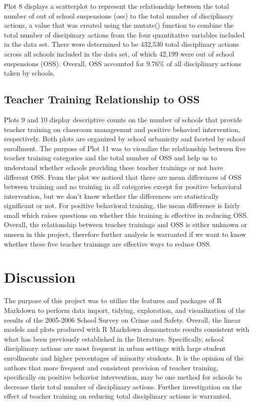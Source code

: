 \documentclass[
  man, fleqn, noextraspace]{apa6}
\begin{document}
Plot 8 displays a scatterplot to represent the relationship between the total number of out of school suspensions (oss) to the total number of disciplinary actions, a value that was created using the mutate() function to combine the total number of discipinary actions from the four quantitative variables included in the data set. There were determined to be 432,530 total disciplinary actions across all schools included in the data set, of which 42,199 were out of school suspensions (OSS). Overall, OSS accounted for 9.76\% of all disciplinary actions taken by schools.

\hypertarget{teacher-training-relationship-to-oss-1}{%
\subsection{Teacher Training Relationship to OSS}\label{teacher-training-relationship-to-oss-1}}

Plots 9 and 10 display descriptive counts on the number of schools that provide teacher training on classroom manageemnt and positive behaviorl intervention, respectively. Both plots are organized by school urbanicity and faceted by school enrollment. The purpose of Plot 11 was to visualize the relationship between five teacher training categories and the total number of OSS and help us to understand whether schools providing these teacher trainings or not have different OSS. From the plot we noticed that there are mean differences of OSS between training and no training in all categories except for positive behavioral intervention, but we don't know whether the differences are statistically significant or not. For positive behavioral training, the mean difference is fairly small which raises questions on whether this training is effective in reducing OSS. Overall, the relationship between teacher trainings and OSS is either unknown or unseen in this project, therefore further analysis is warranted if we want to know whether these five teacher trainings are effective ways to reduce OSS.

\hypertarget{discussion}{%
\section{Discussion}\label{discussion}}

The purpose of this project was to utilize the features and packages of R Markdown to perform data import, tidying, exploration, and visualization of the results of the 2005-2006 School Survey on Crime and Safety. Overall, the linear models and plots produced with R Markdown demonstrate results consistent with what has been previously established in the literature. Specifically, school disciplinary actions are most frequent in urban settings with large student enrollments and higher percentages of minority students. It is the opinion of the authors that more frequent and consistent provision of teacher training, specifically on positive behavior intervention, may be one method for schools to decrease their total number of disciplinary actions. Further investigation on the effect of teacher training on reducing total disciplinary actions is warranted.
\end{document}
